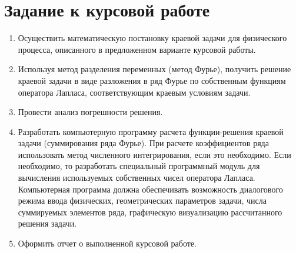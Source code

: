 
\setcounter{page}{2}



\section*{Задание к курсовой работе}
{
	\begin{enumerate}
	    \item Осуществить  математическую  постановку  краевой  задачи  для физического процесса, описанного в предложенном варианте курсовой работы.
        \item Используя  метод  разделения  переменных  (метод  Фурье),  получить решение краевой задачи в виде разложения в ряд Фурье по собственным функциям оператора Лапласа, соответствующим краевым условиям задачи.
        \item Провести анализ погрешности решения.
        \item Разработать  компьютерную  программу  расчета  функции-решения краевой  задачи  (суммирования  ряда  Фурье). При  расчете коэффициентов ряда использовать метод численного интегрирования, если  это  необходимо. Если необходимо, то разработать специальный программный модуль для вычисления используемых собственных чисел оператора Лапласа. Компьютерная  программа  должна  обеспечивать  возможность  диалогового режима  ввода  физических,  геометрических параметров  задачи,  числа суммируемых  элементов  ряда,  графическую  визуализацию  рассчитанного решения задачи.
        \item Оформить отчет о выполненной курсовой работе.
	\end{enumerate}
}
\newpage

